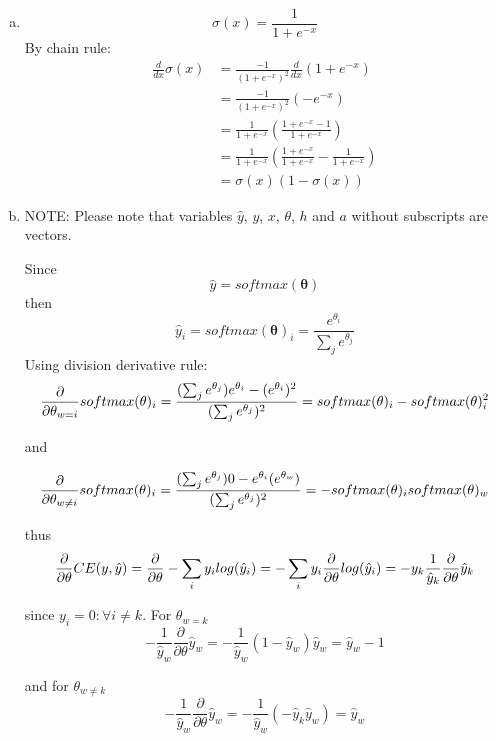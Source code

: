 \documentclass{article}
\begin{document}
\begin{enumerate}[(a)]

\item $$
\sigma(x) = \frac{1}{1+e^{-x}}
$$
By chain rule:
\begin{align*} 
\frac{d}{dx}\sigma(x) &= \frac{-1}{(1+e^{-x})^2} \frac{d}{dx}(1+e^{-x}) \\
&= \frac{-1}{(1+e^{-x})^2} (-e^{-x}) \\
&= \frac{1}{1+e^{-x}} (\frac{1 + e^{-x} - 1}{1+e^{-x}}) \\
&= \frac{1}{1+e^{-x}} (\frac{1 + e^{-x}}{1+e^{-x}} - \frac{1}{1+e^{-x}})  \\
&= \sigma(x) (1 - \sigma(x))
\end{align*}

\item NOTE: Please note that variables $\hat{y}$, $y$, $x$, $\theta$, $h$ and $a$ without subscripts are vectors.

Since $$
\hat{y} = softmax(\mathbf{\theta})
$$ then $$
\hat{y}_i = softmax(\mathbf{\theta})_i = \frac{e^{\theta_i}}{\sum_j{e^{\theta_j}}}
$$
Using division derivative rule:
$$
\frac{\partial}{\partial\theta_{w=i}} softmax(\mathbf{\theta})_i = \frac{(\sum_j{e^{\theta_j}})e^{\theta_i}-(e^{\theta_i})^2}{(\sum_j{e^{\theta_j}})^2} \\
= softmax(\mathbf{\theta})_i - softmax(\mathbf{\theta})_i^2
$$

and

$$
\frac{\partial}{\partial\theta_{w\neq i}} softmax(\mathbf{\theta})_i = \frac{(\sum_j{e^{\theta_j}}) 0-e^{\theta_i}(e^{\theta_w})}{(\sum_j{e^{\theta_j}})^2} \\
= - softmax(\mathbf{\theta})_i softmax(\mathbf{\theta})_w
$$

thus $$
\frac{\partial}{\partial\theta}CE(y,\hat{y}) = \frac{\partial}{\partial\theta}-\sum_i{y_i log(\hat{y}_i)} \\
= -\sum_i{y_i \frac{\partial}{\partial\theta}log(\hat{y}_i)} \\
= -y_k \frac{1}{\hat{y}_k}\frac{\partial}{\partial\theta}\hat{y}_k
$$

since $y_i = 0 : \forall i \neq k$.  For $\theta_{w=k}$ $$
-\frac{1}{\hat{y}_w}\frac{\partial}{\partial\theta}\hat{y}_w =
-\frac{1}{\hat{y}_w}(1 - \hat{y}_w)\hat{y}_w = \hat{y}_w - 1
$$

and for $\theta_{w \neq k}$ $$
-\frac{1}{\hat{y}_w}\frac{\partial}{\partial\theta}\hat{y}_w =
-\frac{1}{\hat{y}_w}(-\hat{y}_k \hat{y}_w) = \hat{y}_w
$$


\end{enumerate}
\end{document}
